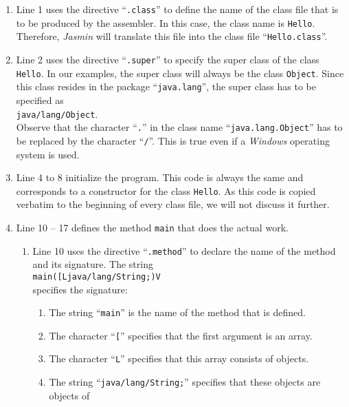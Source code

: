 \begin{enumerate}
\item Line 1 uses the directive ``\texttt{.class}'' to define the name of the class file that is to
      be produced by the assembler.  
      In this case, the class name is \texttt{Hello}.  Therefore, \textsl{Jasmin} will translate
      this file into the class file ``\texttt{Hello.class}''.
\item Line 2 uses the directive ``\texttt{.super}'' to specify the super class of the class
      \texttt{Hello}.  In our examples, the super class will always be the class \texttt{Object}.
      Since this class resides in the package ``\texttt{java.lang}'', the super class has to be
      specified as 
      \\[0.2cm]
      \hspace*{1.3cm}
      \texttt{java/lang/Object}.
      \\[0.2cm]
      Observe that the character ``\texttt{.}'' in the class name ``\texttt{java.lang.Object}''
      has to be replaced by the character ``\texttt{/}''.  This is true even if a \textsl{Windows}
      operating system is used.
\item Line 4 to 8 initialize the program.  This code is always the same and corresponds to a
      constructor for the class \texttt{Hello}.  As this code is copied verbatim to the beginning 
      of every class file, we will not discuss it further. 
\item Line 10 -- 17 defines the method \texttt{main} that does the actual work.
  \begin{enumerate}
  \item Line 10 uses the directive ``\texttt{.method}'' to declare the name of the method and its
        signature.  The string 
        \\[0.2cm]
        \hspace*{1.3cm}
        \texttt{main([Ljava/lang/String;)V}
        \\[0.2cm]
        specifies the signature:
        \begin{enumerate}
        \item The string ``\texttt{main}''  is the name of the method that is defined.
        \item The character ``\texttt{[}'' specifies that the first argument is an array.
        \item The character ``\texttt{L}'' specifies that this array consists of objects.
        \item The string ``\texttt{java/lang/String;}'' specifies that these objects are objects of

\end{enumerate}
\end{enumerate}
\end{enumerate}
